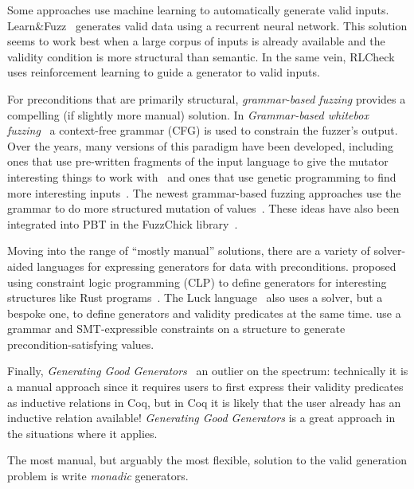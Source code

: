 Some approaches use machine learning to automatically generate valid inputs.
{\sc Learn\&Fuzz}~\cite{godefroid2017learn} generates valid data using a
recurrent neural network.  This solution seems to work best when a large corpus
of inputs is already available and the validity condition is more structural
than semantic. In the same vein, {\sc RLCheck}~\cite{DBLP:conf/icse/ReddyLPS20}
uses reinforcement learning to guide a generator to valid inputs.

For preconditions that are primarily structural, {\em grammar-based fuzzing}
provides a compelling (if slightly more manual) solution. In {\em
Grammar-based whitebox fuzzing}~\cite{godefroid2008grammar} a context-free
grammar (CFG) is used to constrain the fuzzer's output. Over the years, many
versions of this paradigm have been developed, including ones that use
pre-written fragments of the input language to give the mutator interesting
things to work with~\cite{holler2012fuzzing} and ones that use genetic
programming to find more interesting inputs~\cite{veggalam2016ifuzzer}. The
newest grammar-based fuzzing approaches use the grammar to do more structured
mutation of values~\cite{wang2019superion,srivastava2021gramatron}. These ideas have also been integrated
into PBT in the FuzzChick library~\cite{DBLP:journals/pacmpl/Lampropoulos0P19}.

Moving into the range of ``mostly manual'' solutions, there are a variety of
solver-aided languages for expressing generators for data with preconditions.
\citeauthor{dewey2017automated} proposed using constraint logic programming
(CLP) to define generators for interesting structures like Rust
programs~\cite{dewey2017automated}.  The {\sc Luck} language~\cite{LuckPOPL}
also uses a solver, but a bespoke one, to define generators and validity
predicates at the same time. \citet{steinhofel2022input} use a
grammar and SMT-expressible constraints on a structure to generate
precondition-satisfying values.

Finally, {\em Generating Good Generators}~\cite{lampropoulos2017generating} an
outlier on the spectrum: technically it is a manual approach since it requires
users to first express their validity predicates as inductive relations in Coq,
but in Coq it is likely that the user already has an inductive relation
available! {\em Generating Good Generators} is a great approach in the
situations where it applies.

%
%
The most manual, but arguably the most flexible, solution to the valid
generation problem is write {\em monadic} generators.


